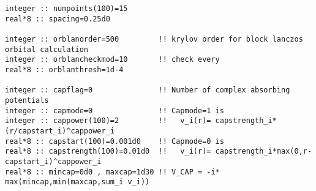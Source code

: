 \begin{verbatim}
integer :: numpoints(100)=15
real*8 :: spacing=0.25d0

integer :: orblanorder=500         !! krylov order for block lanczos orbital calculation
integer :: orblancheckmod=10       !! check every
real*8 :: orblanthresh=1d-4

integer :: capflag=0               !! Number of complex absorbing potentials
integer :: capmode=0               !! Capmode=1 is 
integer :: cappower(100)=2         !!   v_i(r)= capstrength_i*(r/capstart_i)^cappower_i
real*8 :: capstart(100)=0.001d0    !! Capmode=0 is    
real*8 :: capstrength(100)=0.01d0  !!   v_i(r)= capstrength_i*max(0,r-capstart_i)^cappower_i
real*8 :: mincap=0d0 , maxcap=1d30 !! V_CAP = -i* max(mincap,min(maxcap,sum_i v_i))
\end{verbatim}
